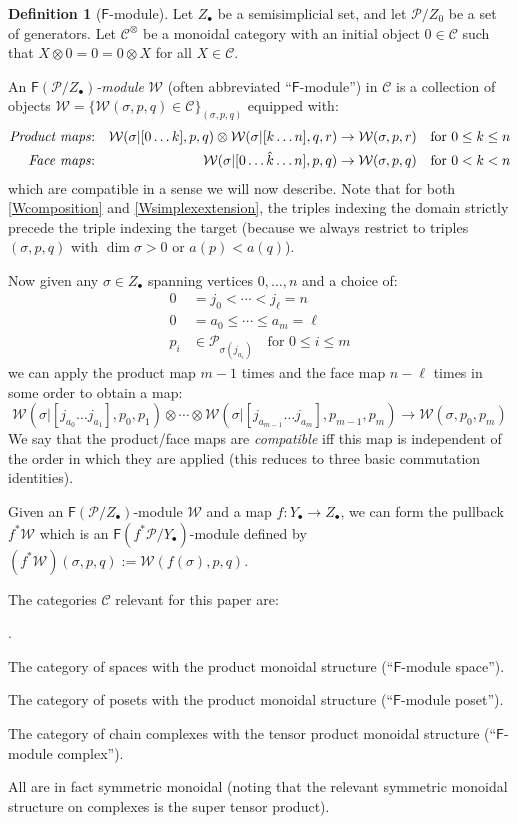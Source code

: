 \documentclass[12pt]{article}
\theoremstyle{definition}
\newtheorem{definition}[theorem]{Definition}
\theoremstyle{remark}
\numberwithin{equation}{subsection}
\newcommand{\C}{\mathcal C}
\newcommand{\W}{\mathcal W}
\newcommand{\PPP}{\mathcal P}
\newcommand{\sF}{\mathsf{F}}
\newcounter{rcounti}
\newenvironment{rlist}{\begin{list}{\roman{rcounti}.}{\usecounter{rcounti}
\setlength\itemsep{0pt}
\setlength\labelsep{4pt}
\setlength\labelwidth{16pt}
\setlength\leftmargin{32pt}
\setlength\listparindent{0pt}
\setlength\parsep{0pt}
\setlength\parskip{0pt}
\setlength\partopsep{0pt}
\setlength\rightmargin{0pt}
\setlength\topsep{0pt}
\setlength\itemindent{0pt}
}}{\end{list}}
\begin{document}
\begin{definition}[$\sF$-module]\label{flowobjectdef}
Let $Z_\bullet$ be a semisimplicial set, and let $\PPP/Z_0$ be a set of generators.  Let $\C^\otimes$ be a monoidal category with an initial object $0\in\C$ such that $X\otimes 0=0=0\otimes X$ for all $X\in\C$.

An \emph{$\sF(\PPP/Z_\bullet)$-module} $\W$ (often abbreviated ``$\sF$-module'') in $\C$ is a collection of objects $\W=\{\W(\sigma,p,q)\in\C\}_{(\sigma,p,q)}$ equipped with:
\begin{align}
\label{Wcomposition}\text{\emph{Product maps}:}&&\W(\sigma|[0\ldots k],p,q)\otimes\W(\sigma|[k\ldots n],q,r)&\to\W(\sigma,p,r)\quad\text{for }0\leq k\leq n\\
\label{Wsimplexextension}\text{\emph{Face maps}:}&&\W(\sigma|[0\ldots\hat k\ldots n],p,q)&\to\W(\sigma,p,q)\quad\text{for }0<k<n
\end{align}
which are compatible in a sense we will now describe.  Note that for both \eqref{Wcomposition} and \eqref{Wsimplexextension}, the triples indexing the domain strictly precede the triple indexing the target (because we always restrict to triples $(\sigma,p,q)$ with $\dim\sigma>0$ or $a(p)<a(q)$).

Now given any $\sigma\in Z_\bullet$ spanning vertices $0,\ldots,n$ and a choice of:
\begin{align}
\label{SdataA}0&=j_0<\cdots<j_\ell=n\\
0&=a_0\leq\cdots\leq a_m=\ell\\
\label{SdataB}p_i&\in\PPP_{\sigma(j_{a_i})}\quad\text{for }0\leq i\leq m
\end{align}
we can apply the product map $m-1$ times and the face map $n-\ell$ times in some order to obtain a map:
\begin{equation}\label{Wtotalcomposition}
\W(\sigma|[j_{a_0}\ldots j_{a_1}],p_0,p_1)\otimes\cdots\otimes\W(\sigma|[j_{a_{m-1}}\ldots j_{a_m}],p_{m-1},p_m)\to\W(\sigma,p_0,p_m)
\end{equation}
We say that the product/face maps are \emph{compatible} iff this map is independent of the order in which they are applied (this reduces to three basic commutation identities).

Given an $\sF(\PPP/Z_\bullet)$-module $\W$ and a map $f:Y_\bullet\to Z_\bullet$, we can form the pullback $f^\ast\W$ which is an $\sF(f^\ast\PPP/Y_\bullet)$-module defined by $(f^\ast\W)(\sigma,p,q):=\W(f(\sigma),p,q)$.

The categories $\C$ relevant for this paper are:
\begin{rlist}
\item The category of spaces with the product monoidal structure (``$\sF$-module space'').
\item The category of posets with the product monoidal structure (``$\sF$-module poset'').
\item The category of chain complexes with the tensor product monoidal structure (``$\sF$-module complex'').
\end{rlist}
All are in fact symmetric monoidal (noting that the relevant symmetric monoidal structure on complexes is the super tensor product).
\end{definition}
\end{document}
